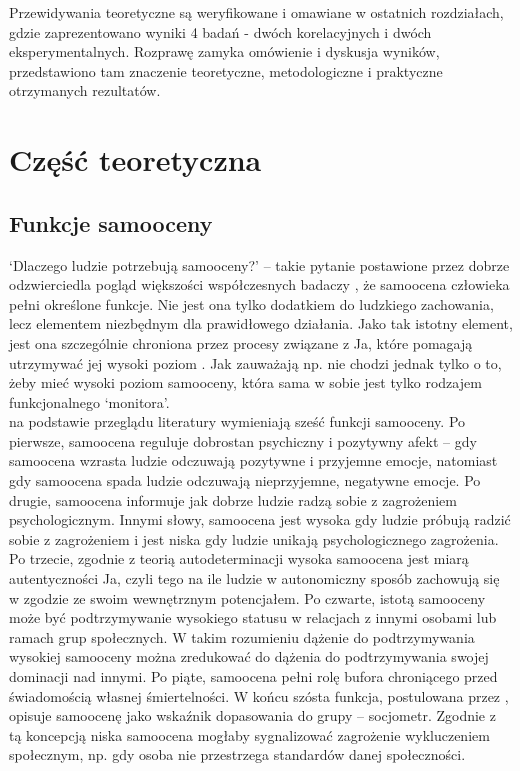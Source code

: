 \documentclass[man]{apa6}
\begin{document}
Przewidywania teoretyczne są weryfikowane i omawiane w ostatnich rozdziałach, gdzie zaprezentowano wyniki 4 badań - dwóch korelacyjnych i dwóch eksperymentalnych. Rozprawę zamyka omówienie i dyskusja wyników, przedstawiono tam znaczenie teoretyczne, metodologiczne i praktyczne otrzymanych rezultatów. \\

\newpage
\section{Część teoretyczna}
\subsection{Funkcje samooceny}

`Dlaczego ludzie potrzebują samooceny?' -- takie pytanie postawione przez \textcite{pyszczynski2004people} dobrze odzwierciedla pogląd większości współczesnych badaczy \parencite[zob. również, ][]{bandura1994self, leary1995self}, że samoocena człowieka pełni określone funkcje. Nie jest ona tylko dodatkiem do ludzkiego zachowania, lecz elementem niezbędnym dla prawidłowego działania. Jako tak istotny element, jest ona szczególnie chroniona przez procesy związane z Ja, które pomagają utrzymywać jej wysoki poziom \parencite{greenwald1980totalitarian}. Jak zauważają np. \textcite{leary2000nature} nie chodzi jednak tylko o to, żeby mieć wysoki poziom samooceny, która sama w sobie jest tylko rodzajem funkcjonalnego `monitora'.\\

\textcite{leary2000nature} na podstawie przeglądu literatury wymieniają sześć funkcji samooceny. Po pierwsze, samoocena reguluje dobrostan psychiczny i pozytywny afekt -- gdy samoocena wzrasta ludzie odczuwają pozytywne i przyjemne emocje, natomiast gdy samoocena spada ludzie odczuwają nieprzyjemne, negatywne emocje. Po drugie, samoocena informuje jak dobrze ludzie radzą sobie z zagrożeniem psychologicznym. Innymi słowy, samoocena jest wysoka gdy ludzie próbują radzić sobie z zagrożeniem i jest niska gdy ludzie unikają psychologicznego zagrożenia. Po trzecie, zgodnie z teorią autodeterminacji \parencite{deci2000and} wysoka samoocena jest miarą autentyczności Ja, czyli tego na ile ludzie w autonomiczny sposób zachowują się w zgodzie ze swoim wewnętrznym potencjałem. Po czwarte, istotą samooceny może być podtrzymywanie wysokiego statusu w relacjach z innymi osobami lub ramach grup społecznych. W takim rozumieniu dążenie do podtrzymywania wysokiej samooceny można zredukować do dążenia do podtrzymywania swojej dominacji nad innymi. Po piąte, samoocena pełni rolę bufora chroniącego przed świadomością własnej śmiertelności. W końcu szósta funkcja, postulowana przez \textcite{leary2000nature}, opisuje samoocenę jako wskaźnik dopasowania do grupy -- socjometr. Zgodnie z tą koncepcją niska samoocena mogłaby sygnalizować zagrożenie wykluczeniem społecznym, np. gdy osoba nie przestrzega standardów danej społeczności.\\
\end{document}

